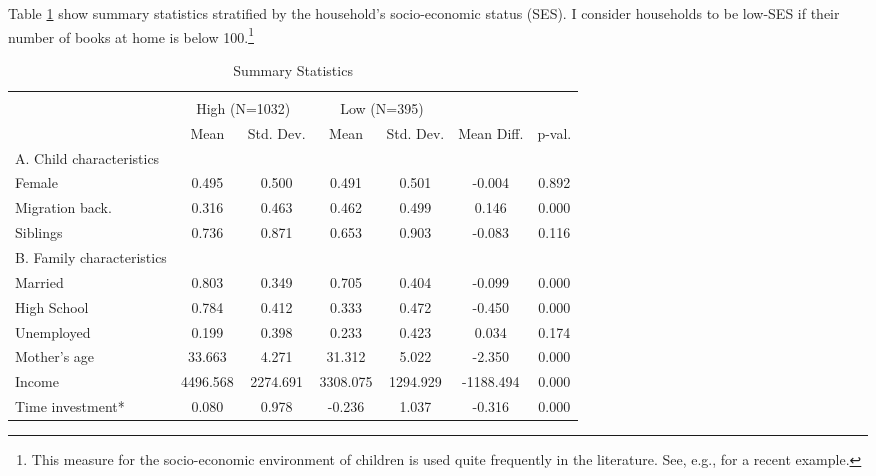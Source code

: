 Table \ref{tab:summ_stats} show summary statistics stratified by the household's socio-economic status (SES). I consider households to be low-SES if their number of books at home is below 100.\footnote{
This measure for the socio-economic environment of children is used quite frequently in the literature. See, e.g., \textcite{resnjanskijCanMentoringAlleviate} for a recent example.
}
%
\begin{table}[!htbp]
	\centering
	\begin{threeparttable}
		\caption{Summary Statistics}
		\label{tab:summ_stats}
		\begin{tabular}[t]{lcccccc}
			\hline\hline\\[-1.8ex] 
			\multicolumn{1}{c}{ } & \multicolumn{2}{c}{High (N=1032)} & \multicolumn{2}{c}{Low (N=395)} & \multicolumn{1}{c}{    } & \multicolumn{1}{c}{    } \\
			\cmidrule(l{3pt}r{3pt}){2-3} \cmidrule(l{3pt}r{3pt}){4-5}
			& Mean & Std. Dev. & Mean  & Std. Dev.  & Mean Diff. & p-val.\\
			\midrule
			A. Child characteristics &&&&&&           \\
			\hspace{5mm}Female & 0.495 & 0.500 & 0.491 & 0.501 & -0.004 & 0.892\\
			\hspace{5mm}Migration back. & 0.316 & 0.463 & 0.462 & 0.499 & 0.146 & 0.000\\
			\hspace{5mm}Siblings & 0.736 & 0.871 & 0.653 & 0.903 & -0.083 & 0.116\\
			B. Family characteristics &&&&&&           \\
			\hspace{5mm}Married & 0.803 & 0.349 & 0.705 & 0.404 & -0.099 & 0.000\\
			\hspace{5mm}High School & 0.784 & 0.412 & 0.333 & 0.472 & -0.450 & 0.000\\
			\hspace{5mm}Unemployed & 0.199 & 0.398 & 0.233 & 0.423 & 0.034 & 0.174\\
			\hspace{5mm}Mother's age & 33.663 & 4.271 & 31.312 & 5.022 & -2.350 & 0.000\\
			\hspace{5mm}Income & 4496.568 & 2274.691 & 3308.075 & 1294.929 & -1188.494 & 0.000\\
			\hspace{5mm}Time investment* & 0.080 & 0.978 & -0.236 & 1.037 & -0.316 & 0.000\\

\end{tabular}
\end{threeparttable}
\end{table}
